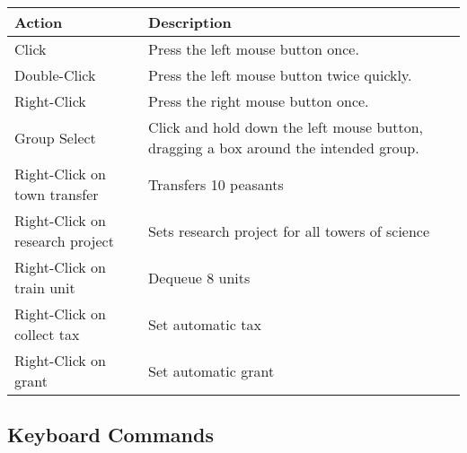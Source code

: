 \begin{center}
	\begin{tabular}{|p{2in}|p{2in}|}
		\hline
		Action	& Description \\ \hline
		Click	& Press the left mouse button once. \\ \hline
		Double-Click	& Press the left mouse button twice quickly. \\ \hline
		Right-Click	& Press the right mouse button once. \\ \hline
		Group Select	& Click and hold down the left mouse button, dragging a box around the intended group. \\ \hline
		Right-Click on town transfer	& Transfers 10 peasants \\ \hline
		Right-Click on research project	& Sets research project for all towers of science \\ \hline
		Right-Click on train unit	& Dequeue 8 units \\ \hline
		Right-Click on collect tax	& Set automatic tax \\ \hline
		Right-Click on grant	&  Set automatic grant \\
		\hline
	\end{tabular}
\end{center}

\subsection{Keyboard Commands}


